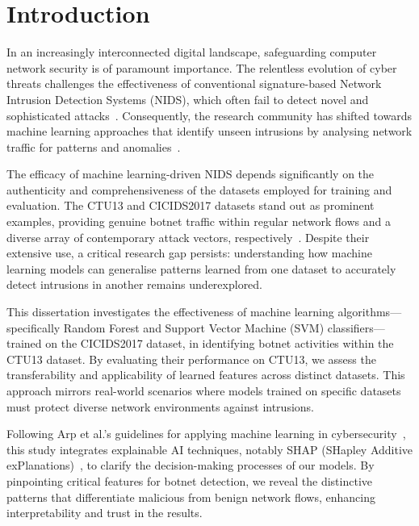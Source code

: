 \chapter{Introduction}\label{chap:introduction}

In an increasingly interconnected digital landscape, safeguarding computer network security is of paramount importance. The relentless evolution of cyber threats challenges the effectiveness of conventional signature-based Network Intrusion Detection Systems (NIDS), which often fail to detect novel and sophisticated attacks~\cite{marchetti2016analysis}. Consequently, the research community has shifted towards machine learning approaches that identify unseen intrusions by analysing network traffic for patterns and anomalies~\cite{buczak2015survey}.

The efficacy of machine learning-driven NIDS depends significantly on the authenticity and comprehensiveness of the datasets employed for training and evaluation. The CTU13 and CICIDS2017 datasets stand out as prominent examples, providing genuine botnet traffic within regular network flows and a diverse array of contemporary attack vectors, respectively~\cite{garcia2014empirical, sharafaldin2018toward}. Despite their extensive use, a critical research gap persists: understanding how machine learning models can generalise patterns learned from one dataset to accurately detect intrusions in another remains underexplored.

This dissertation investigates the effectiveness of machine learning algorithms—specifically Random Forest and Support Vector Machine (SVM) classifiers—trained on the CICIDS2017 dataset, in identifying botnet activities within the CTU13 dataset. By evaluating their performance on CTU13, we assess the transferability and applicability of learned features across distinct datasets. This approach mirrors real-world scenarios where models trained on specific datasets must protect diverse network environments against intrusions.

Following Arp et al.’s guidelines for applying machine learning in cybersecurity~\cite{arp2022and}, this study integrates explainable AI techniques, notably SHAP (SHapley Additive exPlanations)~\cite{lundberg2017unified}, to clarify the decision-making processes of our models. By pinpointing critical features for botnet detection, we reveal the distinctive patterns that differentiate malicious from benign network flows, enhancing interpretability and trust in the results.

